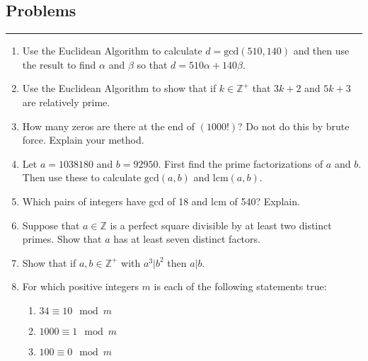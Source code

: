 \documentclass[class=article, crop=false]{standalone}
\def\integers{{\mathbb Z}}
\begin{document}
\subsection{Problems}
\rule{\textwidth}{1pt}
\begin{enumerate}

\item
 Use the Euclidean Algorithm to calculate $d=\mbox{gcd}(510,140)$
  and then use the result to find $\alpha$ and $\beta$ so
  that $d=510\alpha+140\beta$.

\item
  Use the Euclidean Algorithm to show that if $k\in\integers^+$ that
  $3k+2$ and $5k+3$ are relatively prime.

\item
  How many zeros are there at the end of $(1000!)$?  Do not do this
  by brute force.  Explain your method.

\item
  Let $a=1038180$ and $b=92950$.
  First find the prime factorizations of $a$ and $b$.
  Then use these to calculate $\mbox{gcd}(a,b)$ and $\mbox{lcm}(a,b)$.

\item
  Which pairs of integers have gcd of 18 and lcm of 540?  Explain.

\item
  Suppose that $a\in\integers$ is a perfect square
  divisible by at least two distinct primes.
  Show that $a$ has at least seven distinct factors.

\item
  Show that if $a,b\in\integers^+$ with $a^3\big|b^2$ then $a\big|b$.

\item For which positive integers $m$ is each of the following statements true:
\begin{enumerate}
\item
  $34\equiv 10 \mod m$
\item
  $1000\equiv 1 \mod m$
\item
  $100\equiv 0 \mod m$
\end{enumerate}
	
\end{enumerate}
\end{document}
